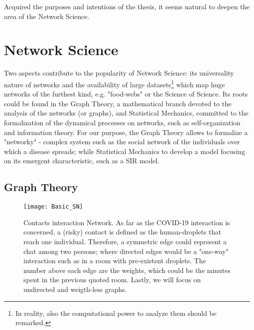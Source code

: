 \documentclass[a4paper,10pt,twoside]{book} %
\theoremstyle{definition}
\begin{document}
Acquired the purposes and intentions of the thesis, it seems natural to deepen the area of the Network Science.


\section{Network Science}

Two aspects contribute to the popularity of Network Science: its universality nature of networks and the availability of large datasets\footnote{In reality, also the computational power to analyze them should be remarked.} which map huge networks of the furthest kind, e.g. "food-webs" or the Science of Science.
Its roots could be found in the Graph Theory, a mathematical branch devoted to the analysis of the networks (or graphs), and Statistical Mechanics, committed to the formalization of the dynamical processes on networks, such as self-organization and information theory.
For our purpose, the Graph Theory allows to formalize a "networky" - complex system such as the social network of the individuals over which a disease spreads; while Statistical Mechanics to develop a model focusing on its emergent characteristic, such as a SIR model.

\subsection{Graph Theory}
\label{sec:GraphTheory}
\begin{figure}[htbp]
	\centering
	\texttt{[image: Basic\_SN]}
	\caption{Contacts interaction Network. As far as the COVID-19 interaction is concerned, a (risky) contact is defined as the human-droplets that reach one individual. Therefore, a symmetric edge could represent a chat among two persons; where directed edges would be a "one-way" interaction such as in a room with pre-existent droplets. The number above each edge are the weights, which could be the minutes spent in the previous quoted room. Lastly, we will focus on undirected and weigth-less graphs.}
	\label{fig:basicSN}
\end{figure}
\end{document}
